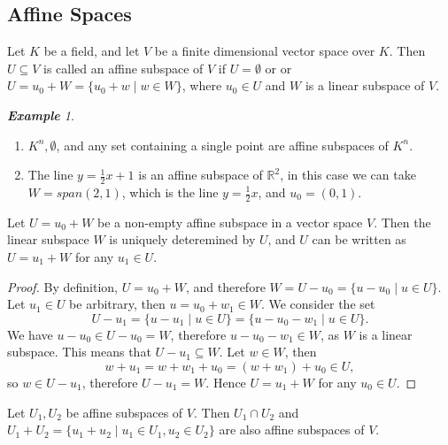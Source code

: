\documentclass[titlepage]{article}
\theoremstyle{remark}
\newtheorem{example}[definition]{\textbf{Example}}
\begin{document}
\subsection{Affine Spaces}
  \begin{definition}
    Let $K$ be a field, and let $V$ be a finite dimensional vector space over $K$. Then $U\subseteq V$ is called an affine subspace of $V$ if $U=\emptyset$ or or $U=u_0+W=\{u_0+w\mid w\in W\}$, where $u_0\in U$ and $W$ is a linear subspace of $V$.
  \end{definition}
  \begin{example}$ $
    \begin{enumerate}
      \item $K^n,\emptyset$, and any set containing a single point are affine subspaces of $K^n$.
      \item The line $y=\frac{1}{2}x+1$ is an affine subspace of $\mathbb{R}^2$, in this case we can take $W=span{(2,1)}$, which is the line $y=\frac{1}{2}x$, and $u_0=(0,1)$.
    \end{enumerate}
  \end{example}
  \begin{proposition}
    Let $U=u_0+W$ be a non-empty affine subspace in a vector space $V$. Then the linear subspace $W$ is uniquely deteremined by $U$, and $U$ can be written as $U=u_1+W$ for any $u_1\in U$.
  \end{proposition}
  \begin{proof}
    By definition, $U=u_0+W$, and therefore $W=U-u_0=\{u-u_0\mid u\in U\}$. Let $u_1\in U$ be arbitrary, then $u=u_0+w_1\in W$. We consider the set 
    \[
      U-u_1=\{u-u_1\mid u\in U\}=\{u-u_0-w_1\mid u\in U\}.
    \]
    We have $u-u_0\in U-u_0=W$, therefore $u-u_0-w_1\in W$, as $W$ is a linear subspace. This means that $U-u_1\subseteq W$. Let $w\in W$, then 
    \[
      w+u_1=w+w_1+u_0=(w+w_1)+u_0\in U,
    \]
    so $w\in U-u_1$, therefore $U-u_1=W$. Hence $U=u_1+W$ for any $u_0\in U$.
  \end{proof}
  \begin{proposition}
    Let $U_1,U_2$ be affine subspaces of $V$. Then $U_1\cap U_2$ and $U_1+U_2=\{u_1+u_2\mid u_1\in U_1, u_2\in U_2\}$ are also affine subspaces of $V$.
  \end{proposition}
\end{document}
